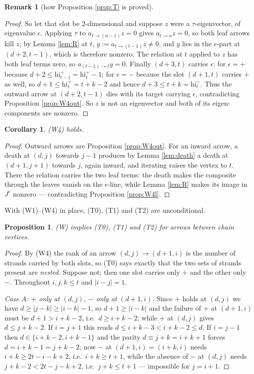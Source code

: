 \documentclass[11pt,reqno]{amsart}
\theoremstyle{plain}
\newtheorem{proposition}[theorem]{Proposition}
\newtheorem{corollary}[theorem]{Corollary}
\theoremstyle{definition}
\newtheorem{remark}[theorem]{Remark}
\begin{document}
\begin{remark}[how Proposition \ref{prop:T} is proved]
\begin{proof}
So let that slot be $2$-dimensional and suppose $z$ were a $\tau$-eigenvector,
of eigenvalue $\epsilon$.  Applying $\tau$ to $a_{t\to(n-1)}z=0$ gives
$a_{t\to n}z=0$, so both leaf arrows kill $z$; by Lemma \ref{lem:R} at $t$,
$y:=a_{t\to(t-1)}z\ne0$, and $y$ lies in the $\epsilon$-part at $(d+2,t-1)$,
which is therefore nonzero.  The relation at $t$ applied to $z$ has both leaf
terms zero, so $a_{(t-1)\to t}y=0$.  Finally $(d+3,t)$ carries $\epsilon$: for
$\epsilon=+$ because $d+2\le\mathrm{hi}^{+}_{t-1}=\mathrm{hi}^{+}_t-1$; for
$\epsilon=-$ because the slot $(d+1,t)$ carries $+$ as well, so
$d+1\le\mathrm{hi}^{+}_t=t+k-2$ and hence $d+3\le t+k=\mathrm{hi}^{-}_t$.  Thus
the outward arrow at $(d+2,t-1)$ dies with its target carrying $\epsilon$,
contradicting Proposition \ref{prop:W4out}.  So $z$ is not an eigenvector and
both of its eigen-components are nonzero.
\end{proof}

\begin{corollary}\label{cor:W4}
(W4) holds.
\end{corollary}

\begin{proof}
Outward arrows are Proposition \ref{prop:W4out}.  For an inward arrow, a death
at $(d,j)$ towards $j-1$ produces by Lemma \ref{lem:death} a death at
$(d+1,j+1)$ towards $j$, again inward, and iterating raises the vertex to $t$.
There the relation carries the two leaf terms: the death makes the composite
through the leaves vanish on the $\epsilon$-line, while Lemma \ref{lem:R} makes
its image in $J^{\epsilon}$ nonzero --- contradicting Proposition
\ref{prop:W4l}.
\end{proof}

With (W1)--(W4) in place, (T0), (T1) and (T2) are unconditional.

\begin{proposition}\label{prop:T012}
(W) implies (T0), (T1) and (T2) for arrows between chain vertices.
\end{proposition}

\begin{proof}
By (W4) the rank of an arrow $(d,j)\to(d+1,i)$ is the number of strands carried
by both slots, so (T0) says exactly that the two sets of strands present are
\emph{nested}.  Suppose not; then one slot carries only $+$ and the other only
$-$.  Throughout $i,j,k\le t$ and $|i-j|=1$.

\emph{Case A: $+$ only at $(d,j)$, $-$ only at $(d+1,i)$.}  Since $+$ holds at
$(d,j)$ we have $d\ge|j-k|\ge|i-k|-1$, so $d+1\ge|i-k|$ and the failure of $+$
at $(d+1,i)$ must be $d+1>i+k-2$, i.e.\ $d\ge i+k-2$; while $+$ at $(d,j)$ gives
$d\le j+k-2$.  If $i=j+1$ this reads $d\le i+k-3<i+k-2\le d$.  If $i=j-1$ then
$d\in\{i+k-2,i+k-1\}$ and the parity $d\equiv j+k=i+k+1$ forces $d=i+k-1=j+k-2$;
now $-$ at $(d+1,i)=(i+k,i)$ needs $i+k\ge 2t-i-k+2$, i.e.\ $i+k\ge t+1$, while
the absence of $-$ at $(d,j)$ needs $j+k-2<2t-j-k+2$, i.e.\ $j+k\le t+1$ ---
impossible for $j=i+1$.


\end{proof}
\end{remark}
\end{document}
